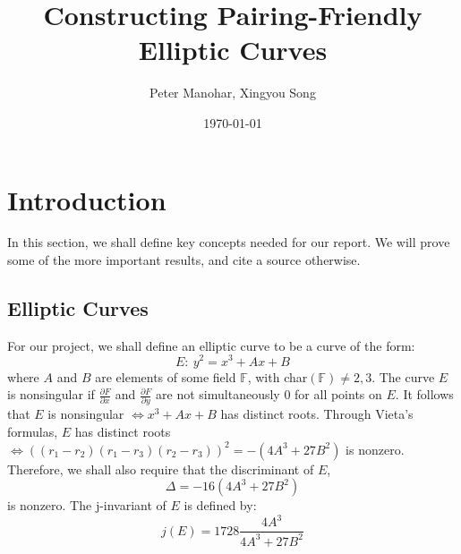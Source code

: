 \documentclass[12pt,twoside]{article}
\title{Constructing Pairing-Friendly Elliptic Curves }
\date{\today}
\author{ Peter Manohar, Xingyou Song}
\begin{document}
\maketitle


\tableofcontents

\section{Introduction}

In this section, we shall define key concepts needed for our report. We will prove some of the more important results, and cite a source otherwise.

\subsection{Elliptic Curves} 
For our project, we shall define an elliptic curve to be a curve of the form:
\begin{equation}
E: \ y^2 = x^3 + Ax + B 
\end{equation}
where $A$ and $B$ are elements of some field $\mathbb F$, with char$(\mathbb F) \ne 2,3$. The curve $E$ is nonsingular if $\frac{\partial F}{\partial x}$ and $\frac{\partial F}{\partial y}$ are not simultaneously $0$ for all points on $E$. It follows that $E$ is nonsingular $\iff x^3+ Ax+ B$ has distinct roots. Through Vieta's formulas, $E$ has distinct roots $\iff ((r_{1} - r_{2})(r_{1} - r_{3})(r_{2} - r_{3}))^{2} = -(4A^{3} + 27B^{2})$ is nonzero. Therefore, we shall also require that the discriminant of $E$,
\begin{equation} 
\Delta = -16(4A^{3} + 27B^{2})
\end{equation}
is nonzero. 
The j-invariant of $E$ is defined by:
\begin{equation}
j(E) = 1728 \frac{4A^{3}}{4A^{3} + 27B^{2}}
\end{equation}
\end{document}
